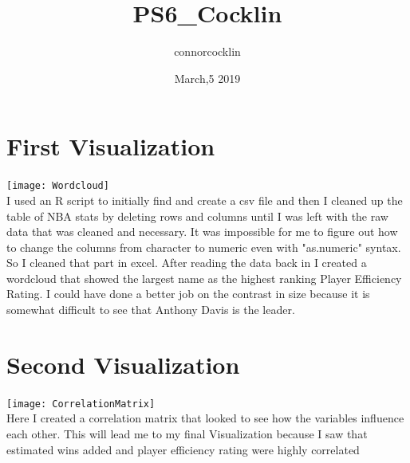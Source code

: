 \documentclass{article}
\title{PS6_Cocklin}
\author{connorcocklin }
\date{March,5 2019}
\begin{document}
\section{First Visualization}
\texttt{[image: Wordcloud]}
\\[12pt]
I used an R script to initially find and create a csv file and then I cleaned up the table of NBA stats by deleting rows and columns until I was left with the raw data that was cleaned and necessary. It was impossible for me to figure out how to change the columns from character to numeric even with "as.numeric" syntax. So I cleaned that part in excel. After reading the data back in I created a wordcloud that showed the largest name as the highest ranking Player Efficiency Rating. I could have done a better job on the contrast in size because it is somewhat difficult to see that Anthony Davis is the leader.



\section{Second Visualization}
\texttt{[image: CorrelationMatrix]}
\\[12pt]
Here I created a correlation matrix that looked to see how the variables influence each other. This will lead me to my final Visualization because I saw that estimated wins added and player efficiency rating were highly correlated
\end{document}
